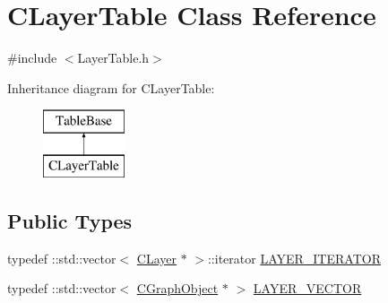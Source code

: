 \hypertarget{class_c_layer_table}{}\section{C\+Layer\+Table Class Reference}
\label{class_c_layer_table}


{\ttfamily \#include $<$Layer\+Table.\+h$>$}

Inheritance diagram for C\+Layer\+Table\+:\begin{figure}[H]
\begin{center}
\leavevmode
\includegraphics[height=2.000000cm]{class_c_layer_table}
\end{center}
\end{figure}
\subsection*{Public Types}
\begin{DoxyCompactItemize}
\item 
typedef \+::std\+::vector$<$ \hyperlink{class_c_layer}{C\+Layer} $\ast$ $>$\+::iterator \hyperlink{class_c_layer_table_ac3f5fb208ea83dd1d39e81301b7bdaaf}{L\+A\+Y\+E\+R\+\_\+\+I\+T\+E\+R\+A\+T\+O\+R}
\item 
typedef \+::std\+::vector$<$ \hyperlink{class_c_graph_object}{C\+Graph\+Object} $\ast$ $>$ \hyperlink{class_c_layer_table_acd81eed52c55ccd6ba9fcbe3bd2451dc}{L\+A\+Y\+E\+R\+\_\+\+V\+E\+C\+T\+O\+R}
\end{DoxyCompactItemize}
